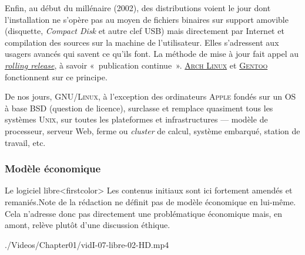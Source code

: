 Enfin, au début du millénaire (2002), des distributions voient le jour dont l'installation ne s'opère pas au moyen de fichiers binaires sur support amovible (disquette, \textit{Compact Disk} et autre clef USB) mais directement par Internet et compilation des sources sur la machine de l'utilisateur. Elles s'adressent aux usagers avancés qui savent ce qu'ils font. La méthode de mise à jour fait appel au \href{https://fr.wikipedia.org/wiki/Rolling_release}{\textit{rolling release}}, à savoir «~publication continue~». \href{https://archlinux.fr/}{\textsc{Arch Linux}} et \href{https://www.gentoo.org/}{\textsc{Gentoo}} fonctionnent sur ce principe.

De nos jours, \textsc{GNU/Linux}, à l'exception des ordinateurs \textsc{Apple} fondés sur un OS à base BSD (question de licence),  surclasse et remplace quasiment tous les systèmes \textsc{Unix}, sur toutes les plateformes et infrastructures --- modèle de processeur, serveur Web, ferme ou \textit{cluster} de calcul, système embarqué, station de travail, etc.


\subsubsection[Modèle économique]{Modèle économique}
\label{subsub:I.4.3.2}

Le logiciel libre\caution[t]<firstcolor>{%
Les contenus initiaux sont ici fortement amendés et remaniés.}{Note de la rédaction}
ne définit pas de modèle économique en lui-même. Cela n'adresse donc pas directement une problématique économique mais, en amont, relève plutôt d'une discussion éthique. 

\begin{marginvideo}
		{./Videos/Chapter01/vidI-07-libre-02-HD.mp4}%
\end{marginvideo}

